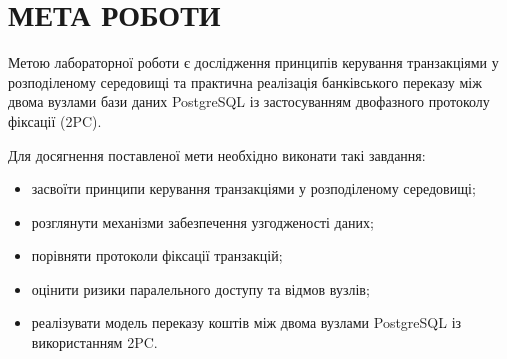 \section*{МЕТА РОБОТИ}
{}

Метою лабораторної роботи є дослідження принципів керування транзакціями у розподіленому середовищі та практична реалізація банківського переказу між двома вузлами бази даних PostgreSQL із застосуванням двофазного протоколу фіксації (2PC).

Для досягнення поставленої мети необхідно виконати такі завдання:
\begin{itemize}
    \item засвоїти принципи керування транзакціями у розподіленому середовищі;
    \item розглянути механізми забезпечення узгодженості даних;
    \item порівняти протоколи фіксації транзакцій;
    \item оцінити ризики паралельного доступу та відмов вузлів;
    \item реалізувати модель переказу коштів між двома вузлами PostgreSQL із використанням 2PC.
\end{itemize}